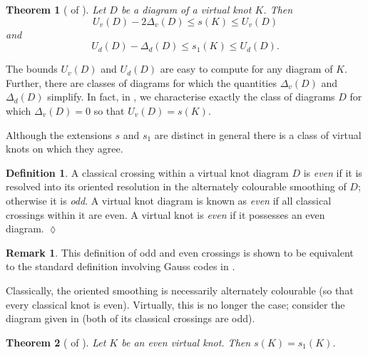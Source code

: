 \documentclass[10pt,oneside]{amsart}
\newtheorem*{theorem*}{Theorem}
\theoremstyle{definition}
\newtheorem{definition}[theorem]{Definition}
\newtheorem*{remark}{Remark}
\numberwithin{equation}{section}
\DeclareRobustCommand{\CloseDef}{	\leavevmode\unskip\penalty9999 \hbox{}\nobreak\hfill
	\quad\hbox{$\lozenge$}}
\begin{document}
\begin{theorem*}[ of ]
	Let \( D \) be a diagram of a virtual knot \( K \). Then
	\begin{equation*}
	U_v ( D ) - 2 \Delta_v ( D ) \leq s ( K ) \leq U_v ( D )
	\end{equation*}
	and
	\begin{equation*}
	U_d ( D ) - \Delta_d ( D ) \leq s_1 ( K ) \leq U_d ( D ).
	\end{equation*}
\end{theorem*}

The bounds \( U_v ( D ) \) and \( U_d ( D ) \) are easy to compute for any diagram of \( K \). Further, there are classes of diagrams for which the quantities \( \Delta_v ( D ) \) and \( \Delta_d ( D ) \) simplify. In fact, in , we characterise exactly the class of diagrams \(D\) for which \( \Delta_v ( D ) = 0 \) so that \( U_v ( D ) = s ( K ) \).

Although the extensions \( s \) and \( s_1 \) are distinct in general there is a class of virtual knots on which they agree.

\begin{definition}
	A classical crossing within a virtual knot diagram \( D \) is \emph{even} if it is resolved into its oriented resolution in the alternately colourable smoothing of \( D \); otherwise it is \emph{odd}. A virtual knot diagram is known as \emph{even} if all classical crossings within it are even. A virtual knot is \emph{even} if it possesses an even diagram.\CloseDef
\end{definition}

\begin{remark}
	This definition of odd and even crossings is shown to be equivalent to the standard definition involving Gauss codes in \cite[Proposition \( 4.11 \)]{Rushworth2017}.
\end{remark}

Classically, the oriented smoothing is necessarily alternately colourable (so that every classical knot is even). Virtually, this is no longer the case; consider the diagram given in  (both of its classical crossings are odd).

\begin{theorem*}[ of ]
	Let \(K\) be an even virtual knot. Then \( s ( K ) = s_1 ( K ) \).
\end{theorem*}
\end{document}
